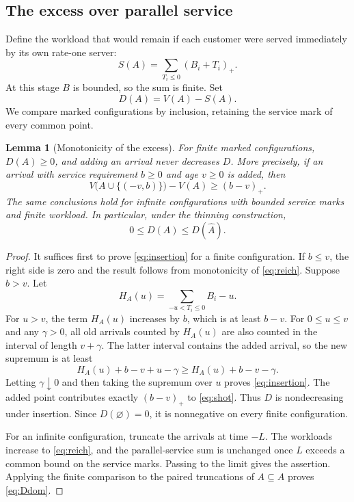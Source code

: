 \documentclass[aap,preprint]{imsart}
\numberwithin{equation}{section}
\theoremstyle{plain}
\newtheorem{lemma}[theorem]{Lemma}
\theoremstyle{definition}
\newcommand{\1}{\mathbf 1}
\begin{document}
\subsection{The excess over parallel service}
Define the workload that would remain if each customer were served immediately by its own rate-one server:
\begin{equation}\label{eq:shot}
 S(A)=\sum_{T_i\le0}(B_i+T_i)_+.
\end{equation}
At this stage $B$ is bounded, so the sum is finite. Set
\begin{equation}\label{eq:D}
 D(A)=V(A)-S(A).
\end{equation}
We compare marked configurations by inclusion, retaining the service mark of every common point.

\begin{lemma}[Monotonicity of the excess]\label{lem:excess}
For finite marked configurations, $D(A)\ge0$, and adding an arrival never decreases $D$. More precisely, if an arrival with service requirement $b\ge0$ and age $v\ge0$ is added, then
\begin{equation}\label{eq:insertion}
 V\bigl(A\cup\{(-v,b)\}\bigr)-V(A)\ge(b-v)_+.
\end{equation}
The same conclusions hold for infinite configurations with bounded service marks and finite workload. In particular, under the thinning construction,
\begin{equation}\label{eq:Ddom}
 0\le D(A)\le D(\widehat A).
\end{equation}
\end{lemma}
\begin{proof}
It suffices first to prove \eqref{eq:insertion} for a finite configuration. If $b\le v$, the right side is zero and the result follows from monotonicity of \eqref{eq:reich}. Suppose $b>v$. Let
\[
 H_A(u)=\sum_{-u<T_i\le0}B_i-u.
\]
For $u>v$, the term $H_A(u)$ increases by $b$, which is at least $b-v$. For $0\le u\le v$ and any $\gamma>0$, all old arrivals counted by $H_A(u)$ are also counted in the interval of length $v+\gamma$. The latter interval contains the added arrival, so the new supremum is at least
\[
 H_A(u)+b-v+u-\gamma\ge H_A(u)+b-v-\gamma.
\]
Letting $\gamma\downarrow0$ and then taking the supremum over $u$ proves \eqref{eq:insertion}. The added point contributes exactly $(b-v)_+$ to \eqref{eq:shot}. Thus $D$ is nondecreasing under insertion. Since $D(\varnothing)=0$, it is nonnegative on every finite configuration.

For an infinite configuration, truncate the arrivals at time $-L$. The workloads increase to \eqref{eq:reich}, and the parallel-service sum is unchanged once $L$ exceeds a common bound on the service marks. Passing to the limit gives the assertion. Applying the finite comparison to the paired truncations of $A\subseteq\widehat A$ proves \eqref{eq:Ddom}.
\end{proof}
\end{document}
